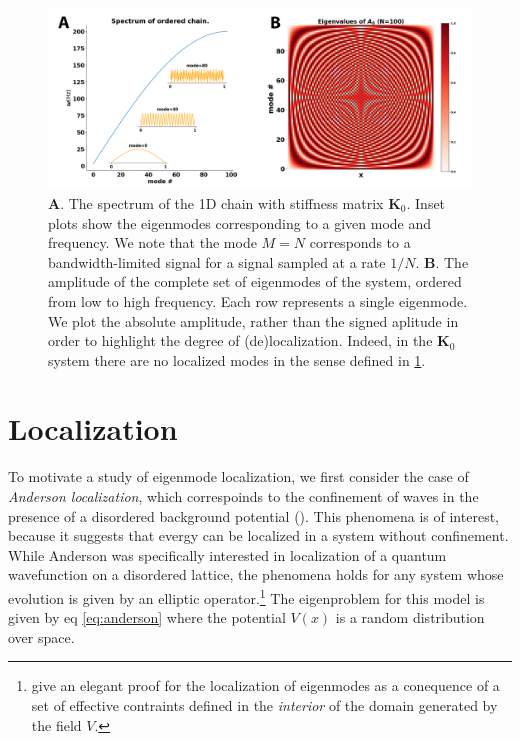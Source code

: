 \documentclass{article}
\begin{document}
\begin{figure}
\begin{center}
\includegraphics[width=\textwidth]{Figures/ordered_spectrum_and_eigenvector.png}
\end{center}
\caption{
	\textbf{A}. The spectrum of the 1D chain with stiffness matrix $\bm{K}_0$. 
	Inset plots show the eigenmodes corresponding to a given mode and frequency.
	We note that the mode $M=N$ corresponds to a bandwidth-limited signal for a signal sampled at a rate $1/N$. 
	\textbf{B}. The amplitude of the complete set of eigenmodes of the system, ordered from low to high frequency. 
Each row represents a single eigenmode.
We plot the absolute amplitude, rather than the signed aplitude in order to highlight the degree of (de)localization. 
Indeed, in the $\bm{K}_0$ system there are no localized modes in the sense defined in \ref{sec:localization}.}
\label{fig:lattice_spectrum}
\end{figure}

\section{Localization}
\label{sec:localization}

To motivate a study of eigenmode localization, we first consider the case of \textit{Anderson localization}, 
which correspoinds to the confinement of waves in the presence of a disordered background potential (\cite{Anderson1958-dt}).
This phenomena is of interest, because it suggests that evergy can be localized in a system without confinement.
While Anderson was specifically interested in localization of a quantum wavefunction on a disordered lattice, 
the phenomena holds for any system whose evolution is given by an elliptic operator.\footnote{
\cite{Filoche2012-av} give an elegant proof for the localization of eigenmodes as a conequence of a set of effective contraints defined in the \textit{interior} of the domain generated by the field $V$.}
The eigenproblem for this model is given by eq \ref{eq:anderson} where the potential $V(x)$ is a random distribution over space. 
\end{document}
